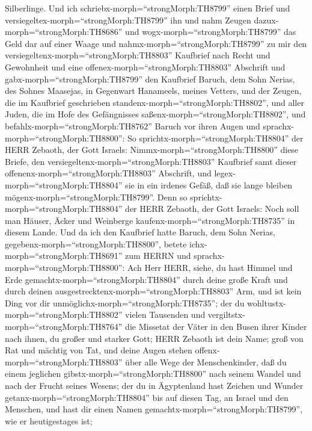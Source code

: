 Silberlinge.  Und ich schriebx-morph=``strongMorph:TH8799''
einen Brief und versiegeltex-morph=``strongMorph:TH8799'' ihn und nahm
Zeugen dazux-morph=``strongMorph:TH8686'' und
wogx-morph=``strongMorph:TH8799'' das Geld dar auf einer Waage
 und nahmx-morph=``strongMorph:TH8799'' zu mir den
versiegeltenx-morph=``strongMorph:TH8803'' Kaufbrief nach Recht und
Gewohnheit und eine offenex-morph=``strongMorph:TH8803'' Abschrift
 und gabx-morph=``strongMorph:TH8799'' den Kaufbrief
Baruch, dem Sohn Nerias, des Sohnes Maasejas, in Gegenwart Hanameels,
meines Vetters, und der Zeugen, die im Kaufbrief geschrieben
standenx-morph=``strongMorph:TH8802'', und aller Juden, die im Hofe des
Gefängnisses saßenx-morph=``strongMorph:TH8802'',  und
befahlx-morph=``strongMorph:TH8762'' Baruch vor ihren Augen und
sprachx-morph=``strongMorph:TH8800'':  So
sprichtx-morph=``strongMorph:TH8804'' der HERR Zebaoth, der Gott
Israels: Nimmx-morph=``strongMorph:TH8800'' diese Briefe, den
versiegeltenx-morph=``strongMorph:TH8803'' Kaufbrief samt dieser
offenenx-morph=``strongMorph:TH8803'' Abschrift, und
legex-morph=``strongMorph:TH8804'' sie in ein irdenes Gefäß, daß sie
lange bleiben mögenx-morph=``strongMorph:TH8799''.  Denn so
sprichtx-morph=``strongMorph:TH8804'' der HERR Zebaoth, der Gott
Israels: Noch soll man Häuser, Äcker und Weinberge
kaufenx-morph=``strongMorph:TH8735'' in diesem Lande.  Und
da ich den Kaufbrief hatte Baruch, dem Sohn Nerias,
gegebenx-morph=``strongMorph:TH8800'', betete
ichx-morph=``strongMorph:TH8691'' zum HERRN und
sprachx-morph=``strongMorph:TH8800'':  Ach Herr HERR,
siehe, du hast Himmel und Erde gemachtx-morph=``strongMorph:TH8804''
durch deine große Kraft und durch deinen
ausgestrecktenx-morph=``strongMorph:TH8803'' Arm, und ist kein Ding vor
dir unmöglichx-morph=``strongMorph:TH8735'';  der du
wohltustx-morph=``strongMorph:TH8802'' vielen Tausenden und
vergiltstx-morph=``strongMorph:TH8764'' die Missetat der Väter in den
Busen ihrer Kinder nach ihnen, du großer und starker Gott; HERR Zebaoth
ist dein Name;  groß von Rat und mächtig von Tat, und deine
Augen stehen offenx-morph=``strongMorph:TH8803'' über alle Wege der
Menschenkinder, daß du einem jeglichen
gibstx-morph=``strongMorph:TH8800'' nach seinem Wandel und nach der
Frucht seines Wesens;  der du in Ägyptenland hast Zeichen
und Wunder getanx-morph=``strongMorph:TH8804'' bis auf diesen Tag, an
Israel und den Menschen, und hast dir einen Namen
gemachtx-morph=``strongMorph:TH8799'', wie er heutigestages ist;
